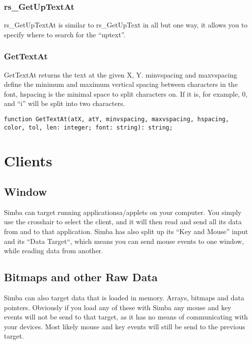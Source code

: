 \documentclass[a4paper]{report}
\begin{document}
\subsection{rs\_GetUpTextAt}

rs\_GetUpTextAt is similar to rs\_GetUpText in all but one way, it allows you to
specify where to search for the ``uptext''.

\subsection{GetTextAt}

GetTextAt returns the text at the given X, Y.
minvspacing and maxvspacing define the minimum and maximum vertical spacing
between characters in the font, hspacing is the minimal space to split
characters on. If it is, for example, 0, and ``i'' will be split into two
characters.


\begin{verbatim}
function GetTextAt(atX, atY, minvspacing, maxvspacing, hspacing, color, tol, len: integer; font: string): string;  
\end{verbatim}

\chapter{Clients}

\section{Window}
Simba can target running applicationsa/applets on your computer. 
You simply use the crosshair to select the client, and it will then read and
send all its data from and to that application. Simba has also split up its
``Key and Mouse'' input and its ``Data Target``, which means you can send
mouse events to one window, while reading data from another.

\section{Bitmaps and other Raw Data}

Simba can also target data that is loaded in memory. Arrays, bitmaps and data
pointers. Obviously if you load any of these with Simba any mouse and key
events will not be send to that target, as it has no means of communicating
with your devices. Most likely mouse and key events will still be send to the
previous target.
\end{document}

